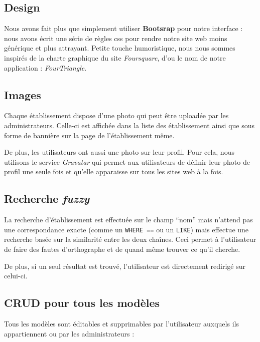 \documentclass[10pt,a4paper]{article}
\begin{document}
\subsection{Design}

Nous avons fait plus que simplement utiliser \textbf{Bootsrap} pour notre interface : nous avons écrit une série de règles css pour rendre notre site web moins générique et plus attrayant. Petite touche humoristique, nous nous sommes inspirés de la charte graphique du site \textit{Foursquare}, d'ou le nom de notre application : \textit{FourTriangle}.

\subsection{Images}

Chaque établissement dispose d'une photo qui peut être uploadée par les administrateurs. Celle-ci est affichée dans la liste des établissement ainsi que sous forme de bannière sur la page de l'établissement même.

De plus, les utilisateurs ont aussi une photo sur leur profil. Pour cela, nous utilisons le service \textit{Gravatar} qui permet aux utilisateurs de définir leur photo de profil une seule fois et qu'elle apparaisse sur tous les sites web à la fois.

\subsection{Recherche \textit{fuzzy}}

La recherche d'établissement est effectuée sur le champ ``nom'' mais n'attend pas une correspondance exacte (comme un \texttt{WHERE ==} ou un \texttt{LIKE}) mais effectue une recherche basée sur la similarité entre les deux chaînes. Ceci permet à l'utilisateur de faire des fautes d'orthographe et de quand même trouver ce qu'il cherche.

De plus, si un seul résultat est trouvé, l'utilisateur est directement redirigé sur celui-ci.

\subsection{CRUD pour tous les modèles}

Tous les modèles sont éditables et supprimables par l'utilisateur auxquels ils appartiennent ou par les administrateurs :
\end{document}
